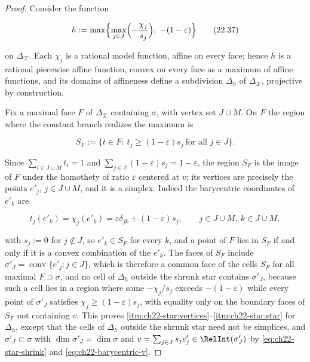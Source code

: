\begin{proof}
Consider the function

\[
 h:=\max\Bigl\{\max_{j\in J}\Bigl(-\frac{\chi_j}{s_j}\Bigr),
       \ -(1-\varepsilon)\Bigr\}
\tag{22.37}\label{eq:ch22-support-function}
\]

on \(\Delta_{\mathcal X}\).  Each \(\chi_j\) is a rational model function,
affine on every face; hence \(h\) is a rational piecewise affine function,
convex on every face as a maximum of affine functions, and its domains of
affineness define a subdivision \(\Delta_h\) of
\(\Delta_{\mathcal X}\), projective by construction.

Fix a maximal face \(F\) of \(\Delta_{\mathcal X}\) containing \(\sigma\),
with vertex set \(J\cup M\).  On \(F\) the region where the constant branch
realizes the maximum is

\[
 S_F:=\{t\in F:\ t_j\geq(1-\varepsilon)s_j\ \text{for all }j\in J\}.
\]

Since \(\sum_{i\in J\cup M}t_i=1\) and
\(\sum_{j\in J}(1-\varepsilon)s_j=1-\varepsilon\), the region \(S_F\) is the
image of \(F\) under the homothety of ratio \(\varepsilon\) centered at
\(v\); its vertices are precisely the points \(e'_j\), \(j\in J\cup M\), and
it is a simplex.  Indeed the barycentric coordinates of \(e'_k\) are

\[
              t_j(e'_k)=\chi_j(e'_k)
              =\varepsilon\delta_{jk}+(1-\varepsilon)s_j,
              \qquad j\in J\cup M,\ k\in J\cup M,
\tag{22.38}\label{eq:ch22-coordinate-values}
\]

with \(s_j:=0\) for \(j\notin J\), so \(e'_k\in S_F\) for every \(k\), and a
point of \(F\) lies in \(S_F\) if and only if it is a convex combination of
the \(e'_k\).  The faces of \(S_F\) include
\(\sigma'_J=\operatorname{conv}\{e'_j:j\in J\}\), which is therefore a common
face of the cells \(S_F\) for all maximal \(F\supset\sigma\), and no cell of
\(\Delta_h\) outside the shrunk star contains \(\sigma'_J\), because such a
cell lies in a region where some \(-\chi_j/s_j\) exceeds
\(-(1-\varepsilon)\) while every point of \(\sigma'_J\) satisfies
\(\chi_j\geq(1-\varepsilon)s_j\), with equality only on the boundary faces of
\(S_F\) not containing \(v\).  This proves
\cref{itm:ch22-star:vertices}--\cref{itm:ch22-star:star} for \(\Delta_h\),
except that the cells of \(\Delta_h\) outside the shrunk star need not be
simplices, and \(\sigma'_J\subset\sigma\) with
\(\dim\sigma'_J=\dim\sigma\) and \(v=\sum_{j\in J}s_je'_j\in
\RelInt(\sigma'_J)\) by \eqref{eq:ch22-star-shrink} and
\eqref{eq:ch22-barycentric-v}.


\end{proof}
